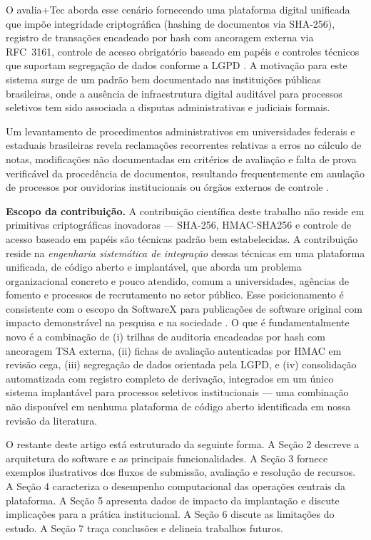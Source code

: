 \documentclass[preprint,12pt,a4paper]{elsarticle}
\begin{document}
O avalia+Tec aborda esse cenário fornecendo uma plataforma digital unificada que impõe integridade criptográfica (hashing de documentos via SHA-256), registro de transações encadeado por hash com ancoragem externa via RFC~3161, controle de acesso obrigatório baseado em papéis e controles técnicos que suportam segregação de dados conforme a LGPD \citep{Piotrowski2007,Marques2022}. A motivação para este sistema surge de um padrão bem documentado nas instituições públicas brasileiras, onde a ausência de infraestrutura digital auditável para processos seletivos tem sido associada a disputas administrativas e judiciais formais.

Um levantamento de procedimentos administrativos em universidades federais e estaduais brasileiras revela reclamações recorrentes relativas a erros no cálculo de notas, modificações não documentadas em critérios de avaliação e falta de prova verificável da procedência de documentos, resultando frequentemente em anulação de processos por ouvidorias institucionais ou órgãos externos de controle \citep{Machado2018,Hood2007}.

\textbf{Escopo da contribuição.} A contribuição científica deste trabalho não reside em primitivas criptográficas inovadoras --- SHA-256, HMAC-SHA256 e controle de acesso baseado em papéis são técnicas padrão bem estabelecidas. A contribuição reside na \emph{engenharia sistemática de integração} dessas técnicas em uma plataforma unificada, de código aberto e implantável, que aborda um problema organizacional concreto e pouco atendido, comum a universidades, agências de fomento e processos de recrutamento no setor público. Esse posicionamento é consistente com o escopo da SoftwareX para publicações de software original com impacto demonstrável na pesquisa e na sociedade \citep{Sommerville2016}. O que é fundamentalmente novo é a combinação de (i) trilhas de auditoria encadeadas por hash com ancoragem TSA externa, (ii) fichas de avaliação autenticadas por HMAC em revisão cega, (iii) segregação de dados orientada pela LGPD, e (iv) consolidação automatizada com registro completo de derivação, integrados em um único sistema implantável para processos seletivos institucionais --- uma combinação não disponível em nenhuma plataforma de código aberto identificada em nossa revisão da literatura.

O restante deste artigo está estruturado da seguinte forma. A Seção 2 descreve a arquitetura do software e as principais funcionalidades. A Seção 3 fornece exemplos ilustrativos dos fluxos de submissão, avaliação e resolução de recursos. A Seção 4 caracteriza o desempenho computacional das operações centrais da plataforma. A Seção 5 apresenta dados de impacto da implantação e discute implicações para a prática institucional. A Seção 6 discute as limitações do estudo. A Seção 7 traça conclusões e delineia trabalhos futuros.
\end{document}
